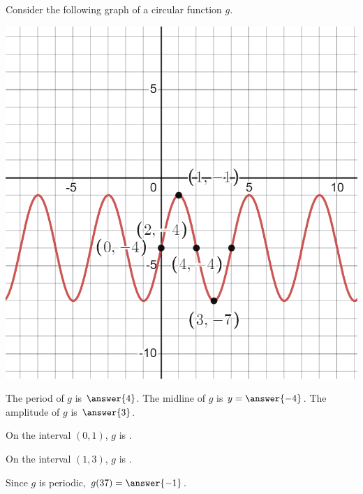 \documentclass{ximera}
\author{Kenneth Berglund}
\begin{document}
\begin{exercise}
Consider the following graph of a circular function $g$.

\includegraphics[width=1\linewidth]{ex11.png}

The period of $g$ is $\answer{4}$. The midline of $g$ is $y = \answer{-4}$. The amplitude of $g$ is $\answer{3}$.

On the interval $(0, 1)$, $g$ is .

On the interval $(1, 3)$, $g$ is .

Since $g$ is periodic, $g(37) = \answer{-1}$. 


\end{exercise}
\end{document}
